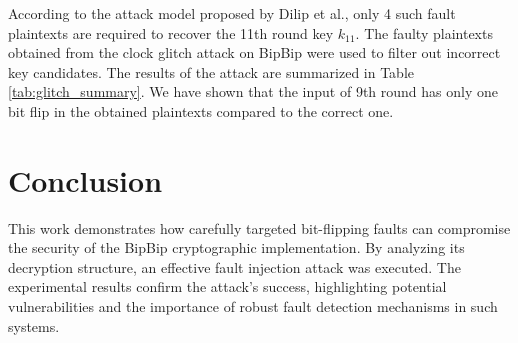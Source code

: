 According to the attack model proposed by Dilip et al., only 4 such fault plaintexts are required to recover the 11th round key $k_{11}$. The faulty plaintexts obtained from the clock glitch attack on BipBip were used to filter out incorrect key candidates. The results of the attack are  summarized in Table \ref{tab:glitch_summary}. We have shown that the input of 9th round has only one bit flip in the obtained plaintexts compared to the correct one.
    
\section{Conclusion}

This work demonstrates how carefully targeted bit-flipping faults can compromise the security of the BipBip cryptographic implementation. By analyzing its decryption structure, an effective fault injection attack was executed. The experimental results confirm the attack's success, highlighting potential vulnerabilities and the importance of robust fault detection mechanisms in such systems.

